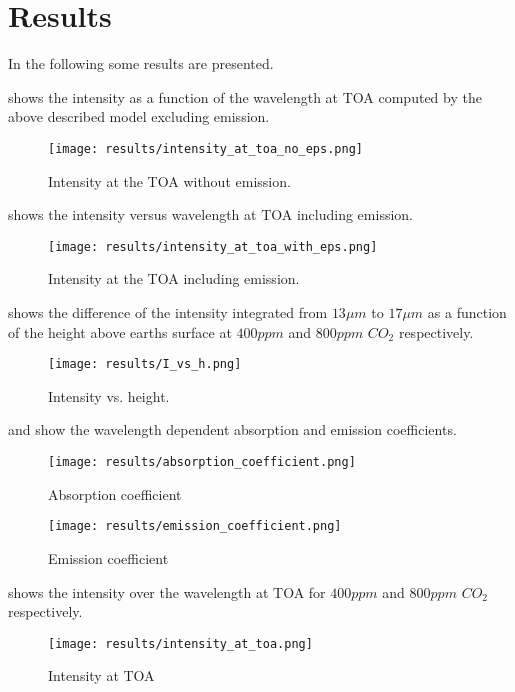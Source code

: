 \section{Results}

In the following some results are presented. 

 shows the intensity as a function of the wavelength at TOA computed by the above described model excluding emission.   
\begin{figure}[ht]
 	\texttt{[image: results/intensity\_at\_toa\_no\_eps.png]}
	\caption{Intensity at the TOA without emission.}
	\label{fig:toa1}
\end{figure}

 shows the intensity versus wavelength at TOA including emission.   
\begin{figure}[ht]
	\texttt{[image: results/intensity\_at\_toa\_with\_eps.png]}
	\caption{Intensity at the TOA including emission.}
	\label{fig:toa2}
\end{figure}


 shows the difference of the intensity integrated from $13 \mu m$ to $17 \mu m$ as a function of the height above earths surface at $400 ppm$ and $800 ppm$ $CO_2$ respectively.   
\begin{figure}[ht]
	\texttt{[image: results/I\_vs\_h.png]}
	\caption{Intensity vs. height.}
	\label{fig:I_vs_h}
\end{figure}

 and  show the wavelength dependent absorption and emission coefficients. 
\begin{figure}[ht]
	\texttt{[image: results/absorption\_coefficient.png]}
	\caption{Absorption coefficient}
	\label{fig:abs_coeff}
\end{figure}

\begin{figure}[ht]
	\texttt{[image: results/emission\_coefficient.png]}
	\caption{Emission coefficient}
	\label{fig:em_coeff}
\end{figure}

 shows the intensity over the wavelength at TOA for $400 ppm$ and $800 ppm$ $CO_2$ respectively. 
\begin{figure}[ht]
	\texttt{[image: results/intensity\_at\_toa.png]}
	\caption{Intensity at TOA}
	\label{fig:int_toa1}
\end{figure}
\newline
\newline

